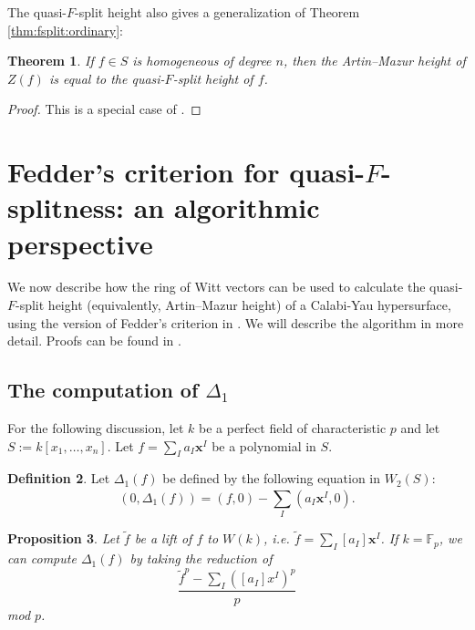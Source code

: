 \documentclass[a4paper]{article}
\newtheorem{thm}{Theorem}[section]
\newtheorem{prop}[thm]{Proposition}
\theoremstyle{definition}
\newtheorem{defn}[thm]{Definition}
\theoremstyle{remark}
\begin{document}
The quasi-\(F\)-split height also gives a generalization
of Theorem \ref{thm:fsplit:ordinary}:

\begin{thm}
	If \(f \in S\) is homogeneous of degree \(n\),
	then the Artin--Mazur height of \(Z(f)\)
	is equal to the quasi-\(F\)-split height
	of \(f\).
\end{thm}

\begin{proof}
	This is a special case of 
	\cite[Theorem~4.5]{yobuko-2019-qfs-calabi-yau}.
\end{proof}

\section{Fedder's criterion for quasi-\(F\)-splitness: an algorithmic perspective}

We now describe how the ring of Witt vectors can be used to calculate the 
quasi-\(F\)-split height (equivalently, Artin--Mazur height) of a Calabi-Yau 
hypersurface, using the version of Fedder's criterion in \cite{kty-2022-fedder}.
We will describe the algorithm in more detail. Proofs can be
found in \cite{kty-2022-fedder}.

\subsection{The computation of \(\Delta_{1}\)}

For the following discussion, 
let \(k\) be a perfect field of characteristic \(p\) and 
let \(S := k[x_{1}, \ldots, x_{n}]\).
Let \(f = \sum_{I}^{} a_{I}\mathbf{x}^{I}\) be a polynomial in \(S\).

\begin{defn}
	Let \(\Delta_{1}(f)\)
	be defined by the following equation in \(W_{2}(S)\):
	\[
		(0, \Delta_{1}(f)) = (f,0) - \sum_{I}^{} (a_{I}\mathbf{x}^{I}, 0) 
	.\] 
\end{defn}


\begin{prop}
	\label{prop:delta1:formula}
	Let \(\tilde{f}\) be a lift of \(f\) to \(W(k)\),
	i.e.
	\(\tilde{f} = \sum_{I}^{} [a_{I}] \mathbf{x}^{I}\).
	If \(k = \mathbb{F}_{p}\),
	we can compute \(\Delta_{1}(f)\) by 
	taking the reduction of
	\[
		\frac{\tilde{f}^{p} - \sum_{I}^{} ([a_{I}]x^{I})^{p} }{p}
	\] 
	mod \(p\).
\end{prop}
\end{document}
